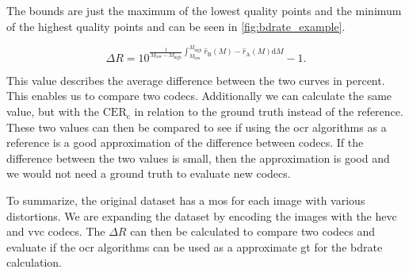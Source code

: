The bounds are just the maximum of the lowest quality points and the minimum of the highest quality points and can be seen in \autoref{fig:bdrate_example}.

\begin{equation}
    \Delta R = 10^{\frac{1}{M_{\text{low}}-M_{\text{high}}} \int_{M_{\text{low}}}^{M_{\text{high}}} \hat{r}_{\text{B}}(M) - \hat{r}_{\text{A}}(M) \text{d}M} - 1.
    \label{eq:bdrate}
\end{equation}

This value describes the average difference between the two curves in percent.
This enables us to compare two codecs.
Additionally we can calculate the same value, but with the $\text{CER}_{\text{c}}$ in relation to the ground truth instead of the reference.
These two values can then be compared to see if using the \gls{ocr} algorithms as a reference is a good approximation of the difference between codecs.
If the difference between the two values is small, then the approximation is good and we would not need a ground truth to evaluate new codecs.

To summarize, the original dataset has a \gls{mos} for each image with various distortions.
We are expanding the dataset by encoding the images with the \gls{hevc} and \gls{vvc} codecs.
The $\Delta R$ can then be calculated to compare two codecs and evaluate if the \gls{ocr} algorithms can be used as a approximate \gls{gt} for the \gls{bdrate} calculation.
